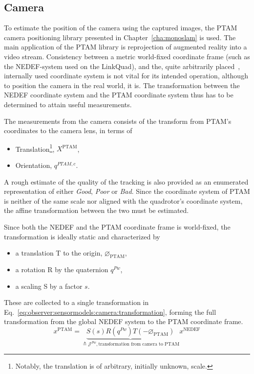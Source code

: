 \subsection{Camera}
\label{ssec:observer:sensormodels:camera}
    To estimate the position of the camera using the captured images,
    the PTAM camera positioning library presented in Chapter~\ref{cha:monoslam} is used.
    The main application of the PTAM library is reprojection of
    augmented reality into a video stream.
    Consistency between a metric world-fixed coordinate frame
    (such as the NEDEF-system used on the LinkQuad), and the, quite arbitrarily placed~\citep{klein07parallel},
    internally used coordinate system is not vital for its intended operation,
    although to position the camera in the real world, it is.
    The transformation between the NEDEF coordinate system and the
    PTAM coordinate system thus has to be determined to attain useful measurements.

    The measurements from the camera consists of the transform from PTAM's coordinates
    to the camera lens, in terms of
    \begin{itemize}
        \item Translation\footnote{Notably, the translation is of arbitrary, initially unknown, scale.}, $X^{\text{PTAM}}$,
        \item Orientation, $q^{PTAM,c}$.
    \end{itemize}
    A rough estimate of the quality of the tracking is also provided as an enumerated representation of either \textit{Good}, \textit{Poor} or \textit{Bad}.
    Since the coordinate system of PTAM is neither of the same scale nor aligned with the quadrotor's coordinate system,
    the affine transformation between the two must be estimated.

    Since both the NEDEF and the PTAM coordinate frame is world-fixed,
    the transformation is ideally static and characterized by
    \begin{itemize}
        \item a translation T to the origin, $\varnothing_{\text{PTAM}}$,
        \item a rotation R by the quaternion $q^{Pw}$,
        \item a scaling S by a factor $s$.
    \end{itemize}
    These are collected to a single transformation in Eq.~\ref{eq:observer:sensormodels:camera:transformation},
    forming the full transformation from the global NEDEF system to the
    PTAM coordinate frame.
    \begin{equation}
        \label{eq:observer:sensormodels:camera:transformation}
        x^{\text{PTAM}} = \underbrace{S(s) R(q^{Pw}) T(-\varnothing_{\text{PTAM}})}_{\triangleq \mathcal{J}^{Pw}, \text{transformation from camera to PTAM}}
         x^{\text{NEDEF}}
    \end{equation}

